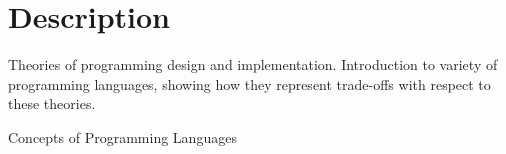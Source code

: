 \documentclass{syllabus}
\begin{document}
\section*{Description}
Theories of programming design and implementation. Introduction to variety of programming languages, showing how they represent trade-offs with respect to these theories.

\begin{text}{Concepts of Programming Languages}
\end{text}

\begin{grading}
\end{grading}




\cheating

\ada

\end{document}
